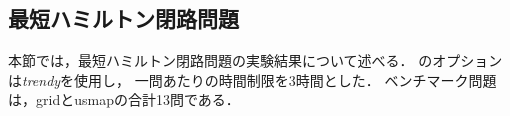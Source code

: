 



\subsection{最短ハミルトン閉路問題}


本節では，最短ハミルトン閉路問題の実験結果について述べる．
{\clingo}のオプションは\textit{trendy}を使用し，
一問あたりの時間制限を3時間とした．
ベンチマーク問題は，\textsf{grid}と\textsf{usmap}の合計13問である．

